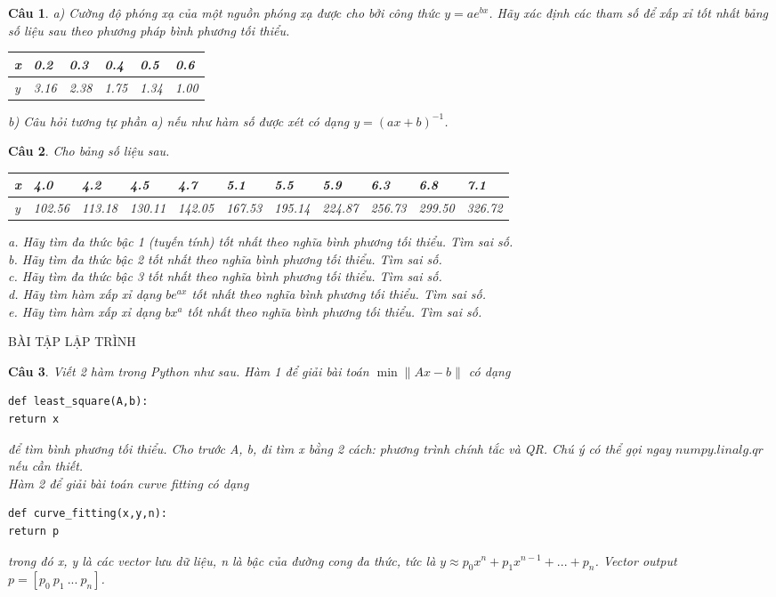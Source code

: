 \documentclass[11pt]{article}
\newtheorem{bt}{Câu}
\begin{document}
\begin{bt} a) Cường độ phóng xạ của một nguồn phóng xạ được cho bởi công thức $y=ae^{bx}$. Hãy xác định các tham số để xấp xỉ tốt nhất bảng số liệu sau theo phương pháp bình phương tối thiểu.
%
\begin{center}
	\begin{tabular}[5]{l|l|l|l|l|l}
		x & 0.2    & 0.3    & 0.4    & 0.5    & 0.6  \\ \hline
		y & 3.16   & 2.38   & 1.75   & 1.34   & 1.00
	\end{tabular}	
\end{center}
%
b) Câu hỏi tương tự phần a) nếu như hàm số được xét có dạng $y=(ax+b)^{-1}$.
\end{bt}

\begin{bt} Cho bảng số liệu sau.
%
\begin{center}
	\begin{tabular}[10]{l|l|l|l|l|l|l|l|l|l|l}
	x & 4.0 & 4.2 & 4.5 & 4.7 & 5.1 & 5.5 & 5.9 & 6.3 & 6.8 & 7.1 \\ \hline
    y & 102.56 & 113.18 &130.11 & 142.05 & 167.53 & 195.14 & 224.87 & 256.73 & 299.50 & 326.72
 	\end{tabular}	
\end{center}
%
a. Hãy tìm đa thức bậc 1 (tuyến tính) tốt nhất theo nghĩa bình phương tối thiểu. Tìm sai số. \\
b. Hãy tìm đa thức bậc 2 tốt nhất theo nghĩa bình phương tối thiểu. Tìm sai số. \\
c. Hãy tìm đa thức bậc 3 tốt nhất theo nghĩa bình phương tối thiểu. Tìm sai số. \\
d. Hãy tìm hàm xấp xỉ dạng $be^{ax}$ tốt nhất theo nghĩa bình phương tối thiểu. Tìm sai số. \\
e. Hãy tìm hàm xấp xỉ dạng $bx^{a}$ tốt nhất theo nghĩa bình phương tối thiểu. Tìm sai số. 
\end{bt}

\newpage 

\begin{center}
	BÀI TẬP LẬP TRÌNH
\end{center}

\begin{bt}
Viết 2 hàm trong Python như sau. Hàm 1 để giải bài toán $\min \|Ax-b\|$ có dạng
%
\begin{lstlisting}[frame=single] 
def least_square(A,b):
return x
\end{lstlisting}
%
để tìm bình phương tối thiểu. Cho trước A, b, đi tìm x bằng 2 cách: phương trình chính tắc và QR. Chú ý có thể gọi ngay $numpy.linalg.qr$ nếu cần thiết. \\
Hàm 2 để giải bài toán curve fitting có dạng
%
\begin{lstlisting}[frame=single] 
def curve_fitting(x,y,n):
return p
\end{lstlisting}
%
trong đó x, y là các vector lưu dữ liệu, n là bậc của đường cong đa thức, tức là $y \approx p_0 x^n+p_1 x^{n-1}+...+p_n$. Vector output $p=[p_0 \ p_1 \ ... \ p_n]$.
\end{bt}
\end{document}
